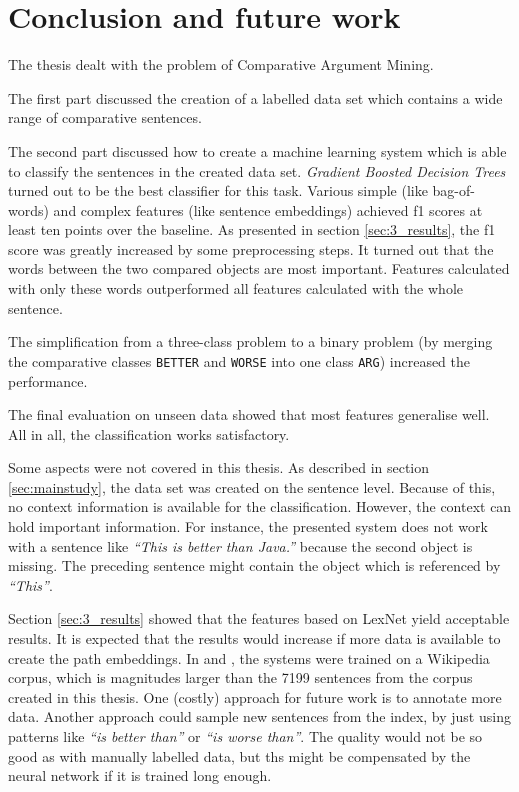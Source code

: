 \chapter{Conclusion and future work}
The thesis dealt with the problem of Comparative Argument Mining. 

The first part discussed the creation of a labelled data set which contains a wide range of comparative sentences.

The second part discussed how to create a machine learning system which is able to classify the sentences in the created data set. \emph{Gradient Boosted Decision Trees} turned out to be the best classifier for this task. Various simple (like bag-of-words) and complex features (like sentence embeddings) achieved f1 scores at least ten points over the baseline. As presented in section \ref{sec:3_results}, the f1 score was greatly increased by some preprocessing steps. It turned out that the words between the two compared objects are most important. Features calculated with only these words outperformed all features calculated with the whole sentence.

The simplification from a three-class problem to a binary problem (by merging the comparative classes \texttt{BETTER} and \texttt{WORSE} into one class \texttt{ARG}) increased the performance.

The final evaluation on unseen data showed that most features generalise well. All in all, the classification works satisfactory.
\newline


Some aspects were not covered in this thesis. As described in section \ref{sec:mainstudy}, the data set was created on the sentence level. Because of this, no context information is available for the classification. However, the context can hold important information. For instance, the presented system does not work with a sentence like \emph{\enquote{This is better than Java.}} because the second object is missing. The preceding sentence might contain the object which is referenced by \emph{\enquote{This}}. 

Section \ref{sec:3_results} showed that the features based on LexNet yield acceptable results. It is expected that the results would increase if more data is available to create the path embeddings. In \cite{DBLP:conf/acl/ShwartzGD16} and \cite{DBLP:journals/corr/ShwartzD16}, the systems were trained on a Wikipedia corpus, which is magnitudes larger than the 7199 sentences from the corpus created in this thesis. One (costly) approach for future work is to annotate more data. Another approach could sample new sentences from the index, by just using patterns like \emph{\enquote{is better than}} or \emph{\enquote{is worse than}}. The quality would not be so good as with manually labelled data, but ths might be compensated by the neural network if it is trained long enough.

